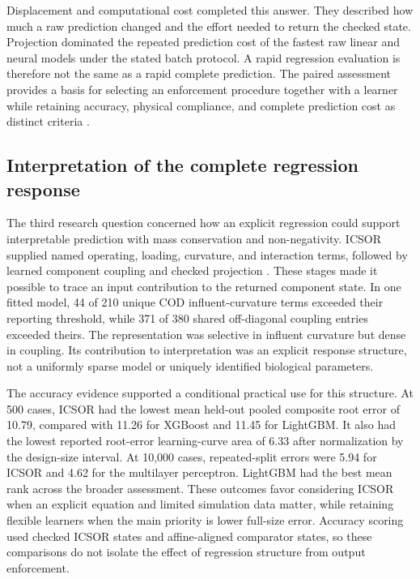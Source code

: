 Displacement and computational cost completed this answer. They described how much a raw prediction changed and the effort needed to return the checked state. Projection dominated the repeated prediction cost of the fastest raw linear and neural models under the stated batch protocol. A rapid regression evaluation is therefore not the same as a rapid complete prediction. The paired assessment provides a basis for selecting an enforcement procedure together with a learner while retaining accuracy, physical compliance, and complete prediction cost as distinct criteria \citep{BhosekarIerapetritou2018}.

\subsection{Interpretation of the complete regression response}

The third research question concerned how an explicit regression could support interpretable prediction with mass conservation and non-negativity. ICSOR supplied named operating, loading, curvature, and interaction terms, followed by learned component coupling and checked projection \citep{Selerio2026}. These stages made it possible to trace an input contribution to the returned component state. In one fitted model, 44 of 210 unique COD influent-curvature terms exceeded their reporting threshold, while 371 of 380 shared off-diagonal coupling entries exceeded theirs. The representation was selective in influent curvature but dense in coupling. Its contribution to interpretation was an explicit response structure, not a uniformly sparse model or uniquely identified biological parameters.

The accuracy evidence supported a conditional practical use for this structure. At 500 cases, ICSOR had the lowest mean held-out pooled composite root error of 10.79, compared with 11.26 for XGBoost and 11.45 for LightGBM. It also had the lowest reported root-error learning-curve area of 6.33 after normalization by the design-size interval. At 10,000 cases, repeated-split errors were 5.94 for ICSOR and 4.62 for the multilayer perceptron. LightGBM had the best mean rank across the broader assessment. These outcomes favor considering ICSOR when an explicit equation and limited simulation data matter, while retaining flexible learners when the main priority is lower full-size error. Accuracy scoring used checked ICSOR states and affine-aligned comparator states, so these comparisons do not isolate the effect of regression structure from output enforcement.

